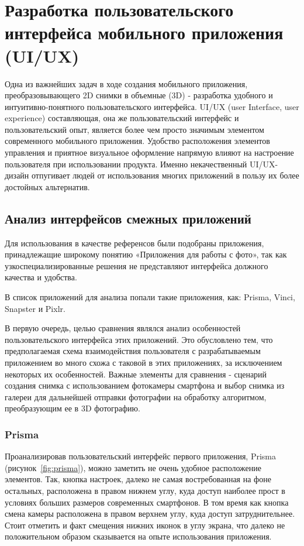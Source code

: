 
\section{Разработка пользовательского интерфейса мобильного приложения (UI/UX)}

Одна из важнейших задач в ходе создания мобильного приложения, преобразовывающего 2D снимки в объемные (3D) - разработка удобного и интуитивно-понятного пользовательского интерфейса. UI/UX (user Interface, user experience) составляющая, она же пользовательский интерфейс и пользовательский опыт, является более чем просто значимым элементом современного мобильного приложения. Удобство расположения элементов управления и приятное визуальное оформление напрямую влияют на настроение пользователя при использовании продукта. Именно некачественный UI/UX-дизайн отпугивает людей от использования многих приложений в пользу их более достойных альтернатив.

\subsection{Анализ интерфейсов смежных приложений}

Для использования в качестве референсов были подобраны приложения, принадлежащие широкому понятию «Приложения для работы с фото», так как узкоспециализированные решения не представляют интерфейса должного качества и удобства.

В список приложений для анализа попали такие приложения, как:  Prisma, Vinci, Snapster и Pixlr.

В первую очередь, целью сравнения являлся анализ особенностей пользовательского интерфейса этих приложений. Это обусловлено тем, что предполагаемая схема  взаимодействия пользователя с разрабатываемым приложением во много схожа с таковой в этих приложениях, за исключением некоторых их особенностей. Важные элементы для сравнения  - сценарий создания снимка с использованием фотокамеры смартфона и выбор снимка из галереи для дальнейшей отправки фотографии на обработку алгоритмом, преобразующим ее в 3D фотографию.

\subsubsection{Prisma}

Проанализировав пользовательский интерфейс первого приложения, Prisma (рисунок~\ref{fig:prisma}), можно заметить не очень удобное расположение элементов. Так, кнопка настроек, далеко не самая востребованная на фоне остальных, расположена в правом нижнем углу, куда доступ наиболее прост в условиях больших размеров современных смартфонов. В том время как кнопка смена камеры расположена в правом верхнем углу, куда доступ затруднительнее. Стоит отметить и факт смещения нижних иконок в углу экрана, что далеко не положительном образом сказывается на опыте использования приложения.

